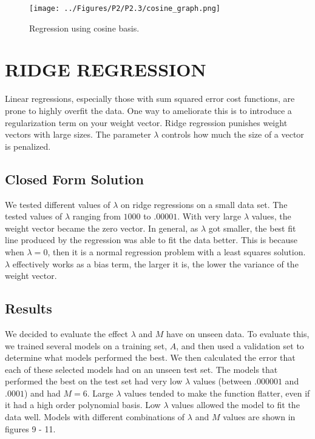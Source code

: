 \documentclass[a4paper,twoside]{article}
\begin{document}
\begin{figure}[h]
  \texttt{[image: ../Figures/P2/P2.3/cosine\_graph.png]}
  \caption{Regression using cosine basis.}
  \label{fig:gradient_converging}
\end{figure}

\vspace{40mm}


\section{\uppercase{Ridge Regression}}

Linear regressions, especially those with sum squared error cost functions, are prone to highly overfit the data. One way to ameliorate this is to introduce a regularization term on your weight vector. Ridge regression punishes weight vectors with large sizes. The parameter $\lambda$ controls how much the size of a vector is penalized. 

\subsection{Closed Form Solution}

We tested different values of $\lambda$ on ridge regressions on a small data set. The tested values of $\lambda$ ranging from $1000$ to $.00001$. With very large $\lambda$ values, the weight vector became the zero vector. In general, as $\lambda$ got smaller, the best fit line produced by the regression was able to fit the data better. This is because when $\lambda = 0$, then it is a normal regression problem with a least squares solution. $\lambda$ effectively works as a bias term, the larger it is, the lower the variance of the weight vector. 


\subsection{Results}

We decided to evaluate the effect $\lambda$ and $M$ have on unseen data. To evaluate this, we trained several models on a training set, $A$, and then used a validation set to determine what models performed the best. We then calculated the error that each of these selected models had on an unseen test set. The models that performed the best on the test set had very low $\lambda$ values (between $.000001$ and $.0001$) and had $M = 6$. Large $\lambda$ values tended to make the function flatter, even if it had a high order polynomial basis. Low $\lambda$ values allowed the model to fit the data well. Models with different combinations of $\lambda$ and $M$ values are shown in figures 9 - 11. 
\end{document}
